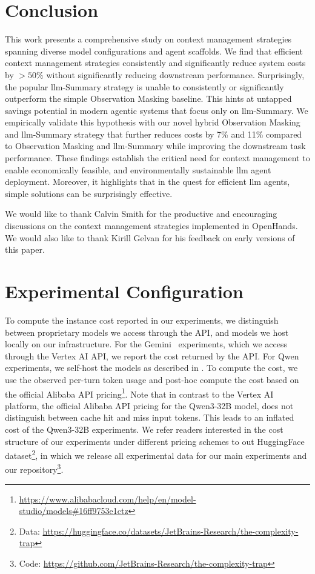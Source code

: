 \documentclass{article}
\begin{document}
\section{Conclusion}
\label{sec:conclusion}
This work presents a comprehensive study on context management strategies spanning diverse model configurations and agent scaffolds. We find that efficient context management strategies consistently and significantly reduce system costs by $>50\%$ without significantly reducing downstream performance. Surprisingly, the popular \ac{llm}-Summary strategy is unable to consistently or significantly outperform the simple Observation Masking baseline. This hints at untapped savings potential in modern agentic systems that focus only on \ac{llm}-Summary. We empirically validate this hypothesis with our novel hybrid Observation Masking and \ac{llm}-Summary strategy that further reduces costs by 7\% and 11\% compared to Observation Masking and \ac{llm}-Summary while improving the downstream task performance. These findings establish the critical need for context management to enable economically feasible, and environmentally sustainable \ac{llm} agent deployment. Moreover, it highlights that in the quest for efficient \ac{llm} agents, simple solutions can be surprisingly effective.

\begin{ack}
We would like to thank Calvin Smith for the productive and encouraging discussions on the context management strategies implemented in OpenHands. We would also like to thank Kirill Gelvan for his feedback on early versions of this paper.
\end{ack}



\appendix
\section{Experimental Configuration}
\label{appendix:experimental-config}
To compute the instance cost reported in our experiments, we distinguish between proprietary models we access through the API, and models we host locally on our infrastructure. For the Gemini~\cite{comanici_gemini_2025} experiments, which we access through the Vertex AI API, we report the cost returned by the API. For Qwen~\cite{qwen3technicalreport,hui2024qwen2} experiments, we self-host the models as described in . To compute the cost, we use the observed per-turn token usage and post-hoc compute the cost based on the official Alibaba API pricing\footnote{ \url{https://www.alibabacloud.com/help/en/model-studio/models\#16ff9753e1ctz}}. Note that in contrast to the Vertex AI platform, the official Alibaba API pricing for the Qwen3-32B model, does not distinguish between cache hit and miss input tokens. This leads to an inflated cost of the Qwen3-32B experiments. We refer readers interested in the cost structure of our experiments under different pricing schemes to out HuggingFace dataset\footnote{Data: \url{https://huggingface.co/datasets/JetBrains-Research/the-complexity-trap}}, in which we release all experimental data for our main experiments and our repository\footnote{Code: \url{https://github.com/JetBrains-Research/the-complexity-trap}}.
\end{document}
